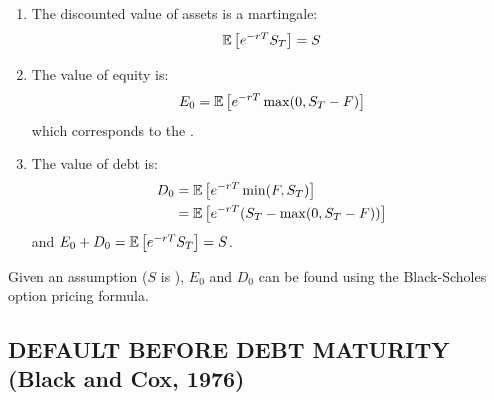 \begin{enumerate}
    \item The discounted value of assets is a martingale:
    \begin{equation*}
        \mathbb E \left[ e^{-rT} S_T \right] = S
    \end{equation*}

    \item The value of equity is:
    \begin{equation*}
        E_0 = \mathbb E \left[ e^{-rT} \max(0, S_T - F) \right]
    \end{equation*}
    which corresponds to the .

    \begin{center}
    \end{center}

    \item The value of debt is:
    \begin{align*}
        D_0 &= \mathbb E \left[ e^{-rT} \min(F, S_T) \right] \\
        &= \mathbb E \left[ e^{-rT} (S_T - \max(0, S_T - F)) \right]
    \end{align*}
    and $E_0 + D_0 = \mathbb E \left[ e^{-rT} S_T \right] = S$.
\end{enumerate}

Given an assumption ($S$ is ), $E_0$ and $D_0$ can be found using the Black-Scholes option pricing formula.

\subsection*{\color{red}DEFAULT BEFORE DEBT MATURITY (Black and Cox, 1976)}

